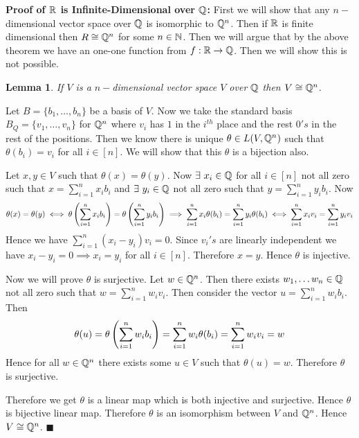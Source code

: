 \documentclass[a4paper, 11pt]{article}
\newtheorem{lemma}{Lemma}
\renewenvironment{proof}{\noindent{\it \textbf{Proof:}}\hspace*{1em}}{\hfill $\blacksquare$\bigskip\\}
\begin{document}
{\begin{itemize}
	\textbf{Proof of $\boldsymbol{\mathbb{R}}$ is Infinite-Dimensional over $\boldsymbol{\mathbb{Q}}$:} First we will show that any $n-$dimensional vector space over $\mathbb{Q}$ is isomorphic to $\mathbb{Q}^n$. Then if $\mathbb{R}$ is finite dimensional then $R\cong \mathbb{Q}^n$ for some $n\in\mathbb{N}$. Then we will argue that by the above theorem we have an one-one function from $f:\mathbb{R}\to \mathbb{Q}$. Then we will show this is not possible.\parinn
	
	\begin{lemma}\label{vtoqiso}
		If $V$ is  a $n-$dimensional vector space $V$ over $\mathbb{Q}$ then $V\cong \mathbb{Q}^n$.
	\end{lemma}
\begin{proof}
	Let $B=\{b_1,\dots,b_n\}$ be a basis of $V$. Now we take the standard basis  $B_Q=\{v_1,\dots,v_n\}$ for $\mathbb{Q}^n$ where $v_i$ has $1$ in the $i^{th}$ place and the rest $0's$ in the rest of the positions. Then we know there is unique $\theta\in L(V,\mathbb{Q}^n)$ such that $\theta(b_i)=v_i$ for all $i\in[n]$. We will show that this $\theta$ is a bijection also.
	
	 Let $x,y\in V$ such that $\theta(x)=\theta(y)$. Now $\exists\ x_i\in \mathbb{Q}$ for all $i\in[n]$ not all zero such that  $x=\sum\limits_{i=1}^nx_ib_i$ and $\exists \ y_i\in\mathbb{Q}$ not all zero such that $y=\sum\limits_{i=1}^ny_ib_i$. Now $$\theta(x)=\theta(y)\iff \theta\left(\sum\limits_{i=1}^nx_ib_i\right)=\theta\left(\sum\limits_{i=1}^ny_ib_i\right)\implies \sum\limits_{i=1}^nx_i\theta(b_i)=\sum\limits_{i=1}^ny_i\theta(b_i)\iff \sum\limits_{i=1}^nx_iv_i=\sum\limits_{i=1}^ny_iv_i$$Hence we have $\sum\limits_{i=1}^n (x_i-y_i)v_i=0$. Since $v_i's $ are linearly independent we have $x_i-y_i=0\implies x_i=y_i$ for all $i\in[n]$. Therefore $x=y$. Hence $\theta$ is injective.
	 
	 Now we will prove $\theta$ is surjective. Let $w\in \mathbb{Q}^n$. Then there exists $w_1,\dots w_n\in \mathbb{Q}$ not all zero such that $w=\sum\limits_{i=1}^n w_iv_i$. Then consider the vector $u=\sum\limits_{i=1}^nw_ib_i$. Then $$\theta(u)=\theta\left(\sum\limits_{i=1}^nw_ib_i\right)=\sum_{i=1}^n w_i\theta(b_i)=\sum_{i=1}^nw_iv_i=w$$Hence for all $w\in \mathbb{Q}^n$ there exists some $u\in V$ such that $\theta(u)=w$. Therefore $\theta$ is surjective. 
	 
	 Therefore we get $\theta$ is a linear map which is both injective and surjective. Hence $\theta$ is bijective linear map. Therefore $\theta$ is an isomorphism between $V$ and $\mathbb{Q}^n$. Hence $V\cong \mathbb{Q}^n$.
\end{proof}


\end{itemize}}
\end{document}
